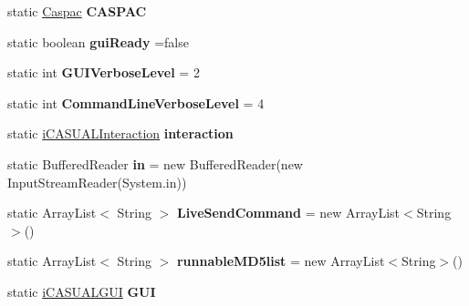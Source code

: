 \begin{DoxyCompactItemize}
\item 
\hypertarget{classCASUAL_1_1Statics_ae51166c9b4716a5d99dd3c2980e591d4}{static \hyperlink{classCASUAL_1_1caspac_1_1Caspac}{Caspac} {\bfseries C\-A\-S\-P\-A\-C}}\label{classCASUAL_1_1Statics_ae51166c9b4716a5d99dd3c2980e591d4}

\item 
\hypertarget{classCASUAL_1_1Statics_aa321005c40596b1d70b5896b1900060c}{static boolean {\bfseries gui\-Ready} =false}\label{classCASUAL_1_1Statics_aa321005c40596b1d70b5896b1900060c}

\item 
\hypertarget{classCASUAL_1_1Statics_a3139dfa174045797602b0a1b26fe7daf}{static int {\bfseries G\-U\-I\-Verbose\-Level} = 2}\label{classCASUAL_1_1Statics_a3139dfa174045797602b0a1b26fe7daf}

\item 
\hypertarget{classCASUAL_1_1Statics_ac8cc722e353daeb4064b0d388791b53a}{static int {\bfseries Command\-Line\-Verbose\-Level} = 4}\label{classCASUAL_1_1Statics_ac8cc722e353daeb4064b0d388791b53a}

\item 
\hypertarget{classCASUAL_1_1Statics_a13341fb41bd033629ea8e850866a9164}{static \hyperlink{interfaceCASUAL_1_1iCASUALInteraction}{i\-C\-A\-S\-U\-A\-L\-Interaction} {\bfseries interaction}}\label{classCASUAL_1_1Statics_a13341fb41bd033629ea8e850866a9164}

\item 
\hypertarget{classCASUAL_1_1Statics_ac6c043a59f301f9973fe47ecbcc6f256}{static Buffered\-Reader {\bfseries in} = new Buffered\-Reader(new Input\-Stream\-Reader(System.\-in))}\label{classCASUAL_1_1Statics_ac6c043a59f301f9973fe47ecbcc6f256}

\item 
\hypertarget{classCASUAL_1_1Statics_aee5399a3c3b43bb6f9d7243bff695655}{static Array\-List$<$ String $>$ {\bfseries Live\-Send\-Command} = new Array\-List$<$String$>$()}\label{classCASUAL_1_1Statics_aee5399a3c3b43bb6f9d7243bff695655}

\item 
\hypertarget{classCASUAL_1_1Statics_ac4cbdf94052d2319d279e8502c3e6c97}{static Array\-List$<$ String $>$ {\bfseries runnable\-M\-D5list} = new Array\-List$<$String$>$()}\label{classCASUAL_1_1Statics_ac4cbdf94052d2319d279e8502c3e6c97}

\item 
\hypertarget{classCASUAL_1_1Statics_aefc3cae5c792c5abd6fd943f4af4beb5}{static \hyperlink{interfaceCASUAL_1_1iCASUALGUI}{i\-C\-A\-S\-U\-A\-L\-G\-U\-I} {\bfseries G\-U\-I}}\label{classCASUAL_1_1Statics_aefc3cae5c792c5abd6fd943f4af4beb5}


\end{DoxyCompactItemize}
